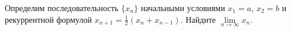 \documentclass{article}
\begin{document}
Определим последовательность $\{x_n\}$ начальными условиями $x_1=a$, $x_2=b$ и рекуррентной формулой $x_{n+1} = \frac12 (x_n + x_{n-1})$. 
Найдите $\lim\limits_{n\to \infty} x_n$.
\end{document}
